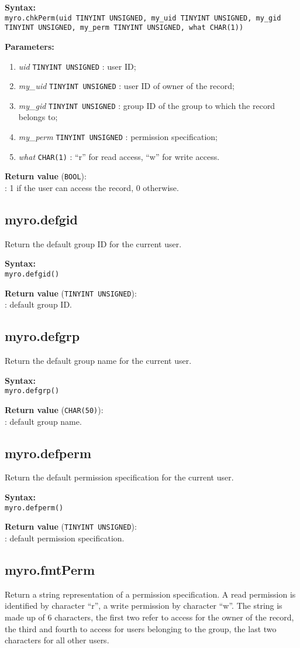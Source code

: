 \documentclass[12pt,titlepage]{article}
\newcommand{\syntax}[1]
{
  \bigskip
  \noindent
  \textbf{Syntax: } \\ 
  \indent \texttt{#1}
}
\newenvironment{parameters}
{
  \bigskip
  \noindent
  \textbf{Parameters:}
  \begin{enumerate}
}
{
  \end{enumerate}
}
\newcommand{\param}[2]
{
  \item \textit{#1} \texttt{#2} 
}
\newcommand{\return}[1]
{
  \bigskip
  \noindent
  \textbf{Return value} (\texttt{#1}): \\
  \indent
}
\begin{document}
\syntax{myro.chkPerm(uid TINYINT UNSIGNED, my\_uid TINYINT UNSIGNED,
  my\_gid TINYINT UNSIGNED, my\_perm TINYINT UNSIGNED, what CHAR(1))}

\begin{parameters}
\param{uid}{TINYINT UNSIGNED}: user ID;
\param{my\_uid}{TINYINT UNSIGNED}: user ID of owner of the record;
\param{my\_gid}{TINYINT UNSIGNED}: group ID of the group to which the
record belongs to;
\param{my\_perm}{TINYINT UNSIGNED}: permission specification;
\param{what}{CHAR(1)}: ``r'' for read access, ``w'' for write access.
\end{parameters}

\return{BOOL}: 1 if the user can access the record, 0 otherwise.

%
\subsection{myro.defgid}
Return the default group ID for the current user.

\syntax{myro.defgid()}

\return{TINYINT UNSIGNED}: default group ID.

%
\subsection{myro.defgrp}
Return the default group name for the current user.

\syntax{myro.defgrp()}

\return{CHAR(50)}: default group name.

%
\subsection{myro.defperm}
Return the default permission specification for the current user.

\syntax{myro.defperm()}

\return{TINYINT UNSIGNED}: default permission specification.



\subsection{myro.fmtPerm}
Return a string representation of a permission specification. A read
permission is identified by character ``r'', a write permission by
character ``w''. The string is made up of 6 characters, the first two
refer to access for the owner of the record, the third and
fourth to access for users belonging to the group, the last two
characters for all other users.
 
\end{document}
